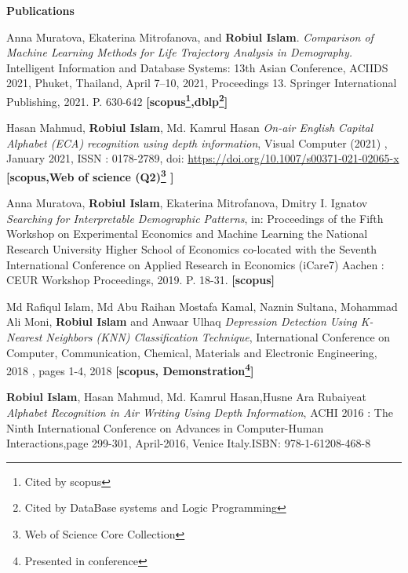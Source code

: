 \documentclass[letterpaper,10pt]{article}
\newcommand{\resheading}[1]{{\large \colorbox{mygrey}{\begin{minipage}{\textwidth}{\textbf{#1 \vphantom{p\^{E}}}}\end{minipage}}}}
\begin{document}
\resheading{Publications}
\begin{thebibliography}{}

\bibitem{}

Anna Muratova, Ekaterina Mitrofanova, and \textbf{Robiul Islam}. \emph{Comparison of Machine Learning Methods for Life Trajectory Analysis in Demography.} Intelligent Information and Database Systems: 13th Asian Conference, ACIIDS 2021, Phuket, Thailand, April 7–10, 2021, Proceedings 13. Springer International Publishing, 2021. P. 630-642 \textbf{[scopus\footnote{Cited by scopus},dblp\footnote{Cited by DataBase systems and Logic Programming}]}

 \bibitem{}
 
 Hasan Mahmud, \textbf{Robiul Islam}, Md. Kamrul Hasan \emph{On-air English Capital Alphabet (ECA) recognition using depth information}, Visual Computer (2021) , January 2021,  ISSN : 0178-2789, doi: \url{https://doi.org/10.1007/s00371-021-02065-x} \textbf{ [scopus\footnotemark[1],Web of science (Q2)\footnote{Web of Science Core Collection} ]} 

\bibitem{}
Anna Muratova, \textbf{Robiul Islam}, Ekaterina Mitrofanova, Dmitry I. Ignatov \emph{Searching for Interpretable Demographic Patterns}, in: Proceedings of the Fifth Workshop on Experimental Economics and Machine Learning the National Research University Higher School of Economics co-located with the Seventh International Conference on Applied Research in Economics (iCare7) Aachen : CEUR Workshop Proceedings, 2019. P. 18-31. \textbf{ [scopus\footnotemark[1]]}  

\bibitem{}
Md Rafiqul Islam, Md Abu Raihan Mostafa Kamal, Naznin Sultana, Mohammad Ali Moni, \textbf{Robiul Islam} and Anwaar Ulhaq \emph{Depression Detection Using K-Nearest Neighbors (KNN) Classification Technique}, International Conference on Computer, Communication, Chemical, Materials and Electronic Engineering, 2018 , pages 1-4, 2018  \textbf{ [scopus\footnotemark[1], Demonstration\footnote{Presented in conference}]} 

\bibitem{}
\textbf{Robiul Islam}, Hasan Mahmud, Md. Kamrul Hasan,Husne Ara Rubaiyeat \emph{Alphabet Recognition in Air Writing Using Depth Information}, ACHI 2016 : The Ninth International Conference on Advances in Computer-Human Interactions,page 299-301, April-2016, Venice Italy.ISBN: 978-1-61208-468-8


\end{thebibliography}
\end{document}
